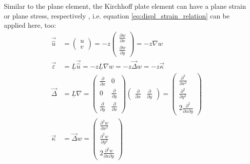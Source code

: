   Similar to the plane element, the Kirchhoff plate element can have a plane strain or plane stress, respectively \cite{steinke2005finite}, i.e. equation \eqref{eq:displ_strain_relation} can be applied here, too:
  \begin{align}
  \vec{\hat{u}} &= \begin{pmatrix}
  u\\v
  \end{pmatrix} = -z \begin{pmatrix}
  \frac{\partial w}{\partial x}\\ \frac{\partial w}{\partial y}
  \end{pmatrix} = -z \nabla w \nonumber\\
  \vec{\varepsilon} &= \underline{L} \vec{\hat{u}} = -z \underline{L} \nabla w = -z \vec{\Delta} w = -z \vec{\kappa} \label{eq:eps=-z*kappa}\\
  \vec{\Delta} &= \underline{L} \nabla = \begin{pmatrix}
  \frac{\partial}{\partial x} & 0\\
  0 & \frac{\partial}{\partial y}\\
  \frac{\partial}{\partial y} & \frac{\partial}{\partial x}
  \end{pmatrix} \begin{pmatrix}
  \frac{\partial}{\partial x} & \frac{\partial}{\partial y}
  \end{pmatrix} = \begin{pmatrix}
  \frac{\partial^2}{\partial x^2}\\
  \frac{\partial^2}{\partial y^2}\\
  2\frac{\partial^2}{\partial x\partial y}
  \end{pmatrix} \nonumber\\
  \vec{\kappa} &= \vec{\Delta}w = \begin{pmatrix}
  \frac{\partial^2w}{\partial x^2}\\
  \frac{\partial^2w}{\partial y^2}\\
  2\frac{\partial^2w}{\partial x\partial y}
  \end{pmatrix} \label{eq:kappa=Delta*w}
  \end{align}
  
